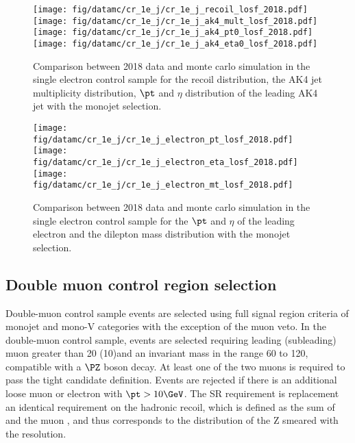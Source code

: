 \begin{figure}[htbp]
    \begin{center}
        \texttt{[image: fig/datamc/cr\_1e\_j/cr\_1e\_j\_recoil\_losf\_2018.pdf]}
        \texttt{[image: fig/datamc/cr\_1e\_j/cr\_1e\_j\_ak4\_mult\_losf\_2018.pdf]} \\
        \texttt{[image: fig/datamc/cr\_1e\_j/cr\_1e\_j\_ak4\_pt0\_losf\_2018.pdf]}
        \texttt{[image: fig/datamc/cr\_1e\_j/cr\_1e\_j\_ak4\_eta0\_losf\_2018.pdf]}
    \end{center}
    \caption{Comparison between 2018 data and monte carlo simulation in the single electron control sample for
        the recoil distribution, the AK4 jet multiplicity distribution,  $\pt$ and $\eta$ distribution
        of the leading AK4  jet with the monojet selection.}
    \label{fig:SE_monojet_2018}
\end{figure}

\begin{figure}[htbp]
    \begin{center}
        \texttt{[image: fig/datamc/cr\_1e\_j/cr\_1e\_j\_electron\_pt\_losf\_2018.pdf]}
        \texttt{[image: fig/datamc/cr\_1e\_j/cr\_1e\_j\_electron\_eta\_losf\_2018.pdf]} \\
        \texttt{[image: fig/datamc/cr\_1e\_j/cr\_1e\_j\_electron\_mt\_losf\_2018.pdf]}
    \end{center}
    \caption{Comparison between 2018 data and monte carlo simulation in the single electron control sample for
        the $\pt$ and $\eta$ of the leading electron and the dilepton mass distribution with the monojet selection.}
    \label{fig:SE_2_monojet_2018}
\end{figure}

\newpage

\subsection{Double muon control region selection}
\label{sec:selection_cr_2m}
Double-muon control sample events are selected using full signal region criteria of monojet and mono-V categories with the exception of the muon veto. 
In the double-muon control sample, events are selected requiring leading (subleading) muon \pt greater than 20 (10)\GeV and an invariant mass in the range 60 to 120\GeV, compatible with a $\PZ$ boson decay. At least one of the two muons is required to pass the tight candidate definition. Events are rejected if there is an additional loose muon or electron with $\pt > 10\GeV$. The SR \ptmiss requirement is replacement an identical requirement on the hadronic recoil, which is defined as the sum of \ptvecmiss and the muon \vpt, and thus corresponds to the distribution of the Z \pt smeared with the \ptmiss resolution.

